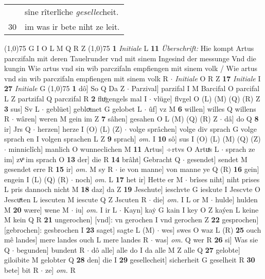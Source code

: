 \documentclass[8pt,a4paper,notitlepage]{article}
\begin{document}
\begin{table}[ht]
\begin{minipage}[t]{0.5\linewidth}
\begin{tabular}{rl}
 & sîne rîterlîche \textit{gesellec}heit.\\ 
30 & im was ir bete niht ze leit.\\ 
\end{tabular}
\scriptsize
\line(1,0){75} \newline
G I O L M Q R Z \newline
\line(1,0){75} \newline
\textbf{1} \textit{Initiale} L  \textbf{11} \textit{Überschrift:} Hie kompt Artus parczifaln mit deren Tauelrunder vnd mit sinem Ingesind der messunge Vnd die kungin Wie artus vnd sin wib parczifaln empfiengen mit sinem volk / Wie artus vnd sin wib parczifaln empfiengen mit sinem volk R   $\cdot$ \textit{Initiale} O R Z  \textbf{17} \textit{Initiale} I  \textbf{27} \textit{Initiale} G  \newline
\line(1,0){75} \newline
\textbf{1} dô] So Q Da Z  $\cdot$ Parzival] parzifal I M Barcifal O parcifal L Z partzifal Q parczifal R \textbf{2} fluͦgengels mal I  $\cdot$ vlüge] flvgel O (L) (M) (Q) (R) Z \textbf{3} sus] Sv L  $\cdot$ geblüet] gebloͮmet G gelobet L  $\cdot$ ûf] vz M \textbf{6} willen] willes Q willens R  $\cdot$ wâren] weren M gein im Z \textbf{7} sâhen] gesahen O L (M) (Q) (R) Z  $\cdot$ dâ] do Q \textbf{8} ir] Jrs Q  $\cdot$ herzen] herze I (O) (L) (Z)  $\cdot$ volge sprâchen] volge div sprach G volge sprach en I volgen sprachen L Z \textbf{9} sprach] \textit{om.} I \textbf{10} sô] sus I (O) (L) (M) (Q) (Z)  $\cdot$ minniclîch] manlich O wunneclichen M \textbf{11} Artus] ÷rtvs O Artuͯs L  $\cdot$ sprach ze im] zvͦ im sprach O \textbf{13} der] die R \textbf{14} brâht] Gebracht Q  $\cdot$ gesendet] sendet M gesendet erre R \textbf{15} ir] \textit{om.} M sy R  $\cdot$ ie von manne] von manne ye Q (R) \textbf{16} gein] engein I (L) (Q) (R)  $\cdot$ noch] \textit{om.} L \textbf{17} het ir] Hette er M  $\cdot$ brîses niht] niht prises L pris dannoch nicht M \textbf{18} daz] da Z \textbf{19} Jeschute] ieschvte G ieskute I Jescvte O Jescuͯten L iescuten M iescute Q Z Jscuten R  $\cdot$ die] \textit{om.} I L or M  $\cdot$ hulde] hulden M \textbf{20} wære] wene M  $\cdot$ iu] \textit{om.} I ir L  $\cdot$ Kayn] kaẏ G kain I key O Z kaýen L keine M kein Q R \textbf{21} ungerochen] [vnd]: vn gerochen I vnd gerochen Z \textbf{22} gesprochen] [gebrochen]: gesbrochen I \textbf{23} saget] sagte L (M)  $\cdot$ wes] swes O waz L (R) \textbf{25} ouch mê landes] mere landes ouch L mere landes R  $\cdot$ was] \textit{om.} Q wer R \textbf{26} si] Was sie Q  $\cdot$ begunden] bundent R  $\cdot$ dô alle] alle do I da alle M Z alle Q \textbf{27} gelobte] giloibite M gelobter Q \textbf{28} den] die I \textbf{29} gesellecheit] sicherheit G geselheit R \textbf{30} bete] bit R  $\cdot$ ze] \textit{om.} R \newline

\end{minipage}
\end{table}
\end{document}
